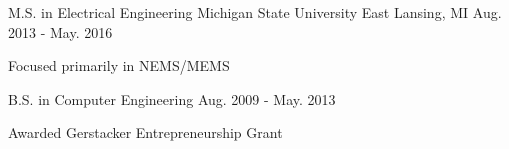

\begin{cventries}

  \cventry
    {M.S. in Electrical Engineering} %
    {Michigan State University} %
    {East Lansing, MI} %
    {Aug. 2013 - May. 2016} %
    {
      \begin{cvitems} %
        \item {Focused primarily in NEMS/MEMS}
      \end{cvitems}
    }

  \cventry
    {B.S. in Computer Engineering} %
    {} %
    {} %
    {Aug. 2009 - May. 2013} %
    {
      \begin{cvitems} %
        \item {Awarded Gerstacker Entrepreneurship Grant}
      \end{cvitems}
    }

\end{cventries}
